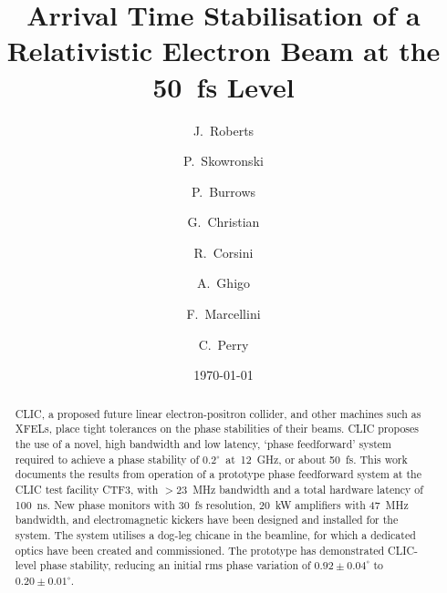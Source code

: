 \documentclass[%
 reprint,
 superscriptaddress,
 amsmath,
 amssymb,
 prl,
]{revtex4-1}
\begin{document}
\title{Arrival Time Stabilisation of a Relativistic Electron Beam at 
the 50~fs Level}

\author{J.~Roberts}

\author{P.~Skowronski}

\author{P.~Burrows}

\author{G.~Christian}

\author{R.~Corsini}

\author{A.~Ghigo}

\author{F.~Marcellini}

\author{C.~Perry}


\date{\today}

\begin{abstract}
CLIC, a proposed future linear electron-positron collider, and other machines 
such as XFELs, place tight tolerances on the phase stabilities of their beams. 
CLIC proposes the use of a novel, high bandwidth and low latency, `phase 
feedforward' system required to achieve a phase stability of 
\(0.2^\circ\)~at~12~GHz, or about 50~fs. This work documents the results from 
operation of a prototype phase feedforward system at the CLIC test facility 
CTF3, with \(>23\)~MHz bandwidth and a total hardware latency of 100~ns. New 
phase monitors with 30~fs resolution, 20~kW amplifiers with 47~MHz bandwidth, 
and electromagnetic kickers have been designed and installed for the system. 
The system utilises a dog-leg chicane in the beamline, for which a dedicated 
optics have been created and commissioned. The prototype has demonstrated 
CLIC-level phase stability, reducing an initial rms phase variation of 
\(0.92\pm0.04^\circ\) to \(0.20\pm0.01^\circ\).
\end{abstract}
\end{document}
